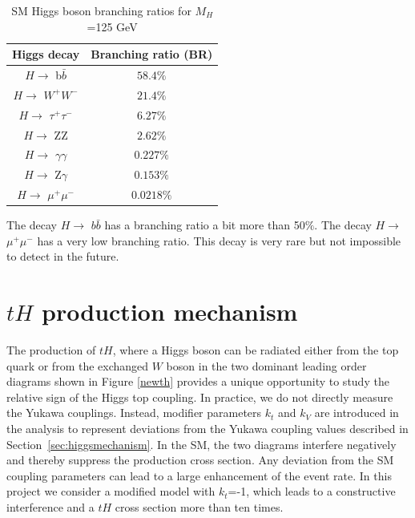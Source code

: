 \begin{table}[ht] 
\caption[SM Higgs boson branching ratios for $M_H$ =125 GeV]{SM Higgs boson branching ratios for $M_H$ =125 GeV \protect \cite{pd}}
\centering
\begin{tabular}{|c|c|}
\hline
Higgs decay & Branching ratio (BR)\\
\hline
$H \rightarrow$ b$\bar{b}$ &$58.4\%$ \\
\hline
 $H \rightarrow$ $W^+W^-$ &$21.4\%$ \\
\hline
$H \rightarrow$ $\tau^+ \tau^-$ & $6.27\%$\\
\hline
$H \rightarrow$ ZZ &$2.62\%$\\
\hline
$H \rightarrow$ $\gamma\gamma$ &$0.227\%$\\
\hline
$H \rightarrow$ Z$\gamma$ &$0.153\%$\\
\hline
$H \rightarrow$ $\mu^+\mu^-$ &$0.0218\%$\\
\hline
\end{tabular}
\label{higgs1}
\end{table}
The decay $H \rightarrow$ $b\bar{b}$ has a branching ratio a bit more than 50$\%$. The decay $H \rightarrow$ $\mu^+\mu^-$ has a very low branching ratio. This decay is very rare but not impossible to detect in the future. %

\section{$tH$ production mechanism}
The production of $tH$, where a Higgs boson can be radiated
either from the top quark or from the exchanged $W$ boson in the two dominant leading order
diagrams shown in Figure \ref{newth} provides a unique opportunity to study the relative sign of the Higgs top coupling.
In practice, we do not directly measure the Yukawa couplings.
Instead, modifier parameters $k_t$ and $k_V$ are introduced in the analysis to represent deviations from the Yukawa coupling values described in Section~\ref{sec:higgsmechanism}. 
In the SM, the two diagrams interfere negatively and thereby suppress the production cross section.
Any deviation from the SM coupling parameters can lead to a large enhancement of the event rate. 
In this project we consider a modified model with $k_t$=-1, which leads to a constructive interference and a $tH$ cross section more than ten times. 


